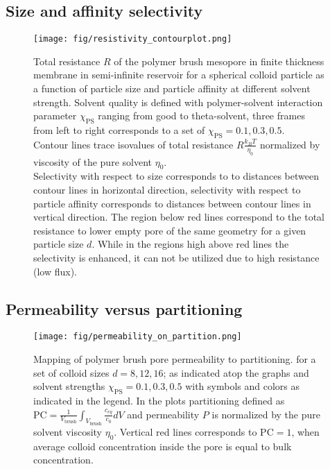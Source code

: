 \documentclass[12pt, a4paper]{article}
\begin{document}
\subsection{Size and affinity selectivity}
\begin{figure}
    \centering
    \texttt{[image: fig/resistivity\_contourplot.png]}
    \caption{
        Total resistance $R$ of the polymer brush mesopore in finite thickness membrane in semi-infinite reservoir for a spherical colloid particle as a function of particle size and particle affinity at different solvent strength.
        Solvent quality is defined with polymer-solvent interaction parameter $\chi_{\textrm{PS}}$ ranging from good to theta-solvent, three frames from left to right corresponds to a set of $\chi_{\textrm{PS}} = {0.1, 0.3, 0.5}$.
        \\
        Contour lines trace isovalues of total resistance $R \frac{k_B T}{\eta_0}$ normalized by viscosity of the pure solvent $\eta_0$.
        \\
        Selectivity with respect to size corresponds to to distances between contour lines in horizontal direction, selectivity with respect to particle affinity corresponds to distances between contour lines in vertical direction.
        The region below red lines correspond to the total resistance to lower empty pore of the same geometry for a given particle size $d$.
        While in the regions high above red lines the selectivity is enhanced, it can not be utilized due to high resistance (low flux).
    }
    \label{fig:R_contourplot}
\end{figure}


\subsection{Permeability versus partitioning}

\begin{figure}
    \centering
    \texttt{[image: fig/permeability\_on\_partition.png]}
    \caption{
        Mapping of polymer brush pore permeability to partitioning.  for a set of colloid sizes $d = {8, 12, 16}$; as indicated atop the graphs and solvent strengths $\chi_{\textrm{PS}} = {0.1, 0.3, 0.5}$ with symbols and colors as indicated in the legend. 
        In the plots partitioning defined as $\textrm{PC} = \frac{1}{V_{\textrm{brush}}}\int_{V_{\textrm{brush}}} \frac{c_{eq}}{c_0} dV$ and permeability $P$ is normalized by the pure solvent viscosity $\eta_{0}$.
        Vertical red lines corresponds to $\textrm{PC}=1$, when average colloid concentration inside the pore is equal to bulk concentration.
        }
        \label{fig:permeability_on_partition}
    \end{figure}


\printbibliography
\end{document}
